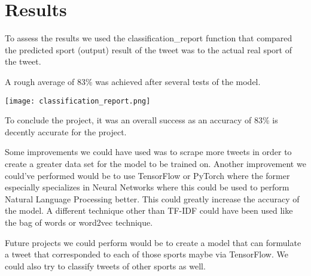 \documentclass{article}
\begin{document}
\section{Results}
    To assess the results we used the classification\_report function that compared the predicted sport (output) result of the tweet was to the actual real sport of the tweet.

    A rough average of 83\% was achieved after several tests of the model. 
    

    \texttt{[image: classification\_report.png]}

    To conclude the project, it was an overall success as an accuracy of 83\% is decently accurate for the project.

    Some improvements we could have used was to scrape more tweets in order to create a greater data set for the model to be trained on. Another improvement we could've performed would be to use TensorFlow or PyTorch where the former especially specializes in Neural Networks where this could be used to perform Natural Language Processing better. This could greatly increase the accuracy of the model. A different technique other than TF-IDF could have been used like the bag of words or word2vec technique.

    Future projects we could perform would be to create a model that can formulate a tweet that corresponded to each of those sports maybe via TensorFlow. We could also try to classify tweets of other sports as well. 
\end{document}

